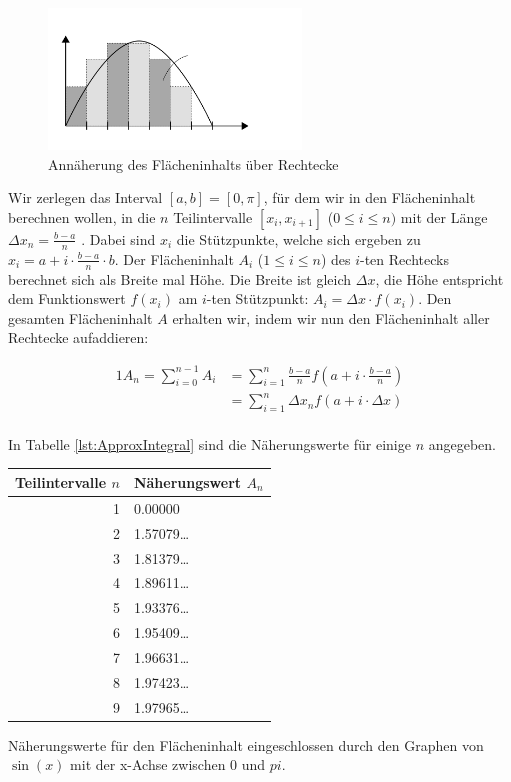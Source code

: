 \begin{figure}
    \centering
    \includegraphics[width=0.6\textwidth]{./svg/integral-univariate-function}
    \caption{Annäherung des Flächeninhalts über Rechtecke}
    \label{fig:ApproxAreaUnivarFun}
\end{figure}

Wir zerlegen das Interval $[a, b] = [0,\pi]$, für dem wir in den Flächeninhalt berechnen wollen, in die $n$ Teilintervalle $[x_i, x_{i+1}]$ ($0\le i \le n)$ mit der Länge $\Delta x_n = \frac{b-a}{n}$ . Dabei sind $x_i$ die Stützpunkte, welche sich ergeben zu $x_i = a + i\cdot\frac{b-a}{n} \cdot b$. Der Flächeninhalt $A_i$ ($1\le i \le n$) des $i$-ten Rechtecks berechnet sich als Breite mal Höhe. Die Breite ist gleich $\Delta x$, die Höhe entspricht dem Funktionswert $f(x_i)$ am $i$-ten Stützpunkt: $A_i = \Delta x \cdot f(x_i)$. Den gesamten Flächeninhalt $A$ erhalten wir, indem wir nun den Flächeninhalt aller Rechtecke aufaddieren:

\begin{alignat*}{1}
  A_n = \sum_{i=0}^{n-1} A_i &= \sum_{i=1}^{n} \frac{b-a}{n} f(a + i\cdot\frac{b-a}{n}) \\
                             &= \sum_{i=1}^{n} \Delta x_n f(a + i\cdot\Delta x) \\
\end{alignat*}

In Tabelle \ref{lst:ApproxIntegral} sind die Näherungswerte für einige $n$ angegeben.

\begin{listing}
    \begin{center}
        \begin{tabular}{ r | l}
            \textbf{Teilintervalle $n$} & \textbf{Näherungswert $A_n$} \\
            \hline
            1 & 0.00000 \\
            2 & 1.57079\dots \\
            3 & 1.81379\dots \\
            4 & 1.89611\dots \\
            5 & 1.93376\dots \\
            6 & 1.95409\dots \\
            7 & 1.96631\dots \\
            8 & 1.97423\dots \\
            9 & 1.97965\dots
        \end{tabular}
    \end{center}
    \caption[Näherungsweise Berechnung eines bestimmen Integrals]{Näherungswerte für den Flächeninhalt eingeschlossen durch den Graphen von $\sin(x)$ mit der x-Achse zwischen $0$ und $pi$.}
    \label{lst:ApproxIntegral}
\end{listing}

